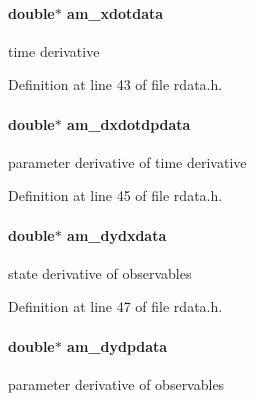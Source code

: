 \hypertarget{struct_return_data_a3ea8fa08fcced0827c1df276b0d253c8}{}
\paragraph[{am\+\_\+xdotdata}]{\setlength{\rightskip}{0pt plus 5cm}double$\ast$ am\+\_\+xdotdata}\label{struct_return_data_a3ea8fa08fcced0827c1df276b0d253c8}
time derivative 

Definition at line 43 of file rdata.\+h.

\hypertarget{struct_return_data_a494b13e9797d95d7fb3c89e09864aa4f}{}
\paragraph[{am\+\_\+dxdotdpdata}]{\setlength{\rightskip}{0pt plus 5cm}double$\ast$ am\+\_\+dxdotdpdata}\label{struct_return_data_a494b13e9797d95d7fb3c89e09864aa4f}
parameter derivative of time derivative 

Definition at line 45 of file rdata.\+h.

\hypertarget{struct_return_data_a831cada35b4f407a2c8ad789dfc534e5}{}
\paragraph[{am\+\_\+dydxdata}]{\setlength{\rightskip}{0pt plus 5cm}double$\ast$ am\+\_\+dydxdata}\label{struct_return_data_a831cada35b4f407a2c8ad789dfc534e5}
state derivative of observables 

Definition at line 47 of file rdata.\+h.

\hypertarget{struct_return_data_a57a7eb2085d8ed5bb6c62331a2aa3af5}{}
\paragraph[{am\+\_\+dydpdata}]{\setlength{\rightskip}{0pt plus 5cm}double$\ast$ am\+\_\+dydpdata}\label{struct_return_data_a57a7eb2085d8ed5bb6c62331a2aa3af5}
parameter derivative of observables 

